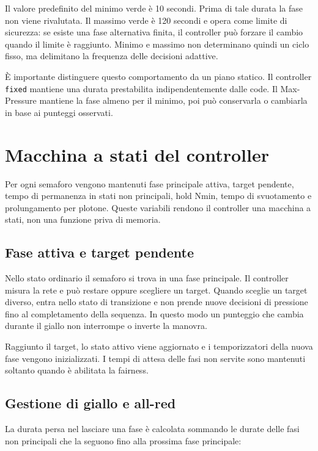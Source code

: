 \documentclass[12pt,a4paper,oneside]{report}
\numberwithin{equation}{chapter}
\begin{document}
Il valore predefinito del minimo verde è 10 secondi. Prima di tale durata la
fase non viene rivalutata. Il massimo verde è 120 secondi e opera come limite
di sicurezza: se esiste una fase alternativa finita, il controller può forzare il cambio
quando il limite è raggiunto. Minimo e massimo non determinano quindi un ciclo
fisso, ma delimitano la frequenza delle decisioni adattive.

È importante distinguere questo comportamento da un piano statico. Il controller \texttt{fixed}
mantiene una durata prestabilita indipendentemente dalle code. Il Max-Pressure
mantiene la fase almeno per il minimo, poi può conservarla o cambiarla in base
ai punteggi osservati.

\section{Macchina a stati del controller}

Per ogni semaforo vengono mantenuti fase principale attiva, target pendente,
tempo di permanenza in stati non principali, hold Nmin, tempo di svuotamento e
prolungamento per plotone. Queste variabili rendono il controller una macchina
a stati, non una funzione priva di memoria.

\subsection{Fase attiva e target pendente}

Nello stato ordinario il semaforo si trova in una fase principale. Il
controller misura la rete e può restare oppure scegliere un target. Quando
sceglie un target diverso, entra nello stato di transizione e non prende nuove
decisioni di pressione fino al completamento della sequenza. In questo modo un
punteggio che cambia durante il giallo non interrompe o inverte la manovra.

Raggiunto il target, lo stato attivo viene aggiornato e i temporizzatori della
nuova fase vengono inizializzati. I tempi di attesa delle fasi non servite sono
mantenuti soltanto quando è abilitata la fairness.

\subsection{Gestione di giallo e all-red}

La durata persa nel lasciare una fase è calcolata sommando le durate delle fasi
non principali che la seguono fino alla prossima fase principale:
\end{document}
